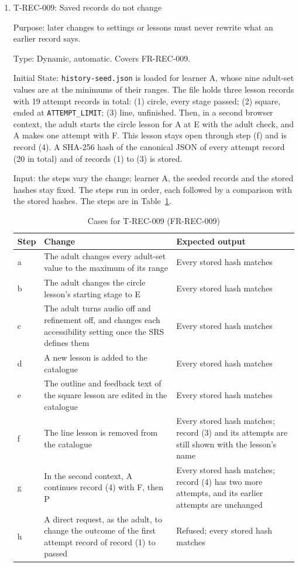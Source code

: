 \documentclass[12pt, titlepage]{article}
\newcommand{\testitem}[1]{\item #1\par\nopagebreak}
\begin{document}
\begin{enumerate}
How test will be performed: Playwright request routing. For (b), the
request reaches the server through \texttt{route.fetch()}, then the route
is aborted. A database read follows.

\testitem{T-REC-009: Saved records do not change}

Purpose: later changes to settings or lessons must never rewrite what an
earlier record says.

Type: Dynamic, automatic. Covers FR-REC-009.

Initial State: \texttt{history-\allowbreak{}seed.json} is loaded for
learner A, whose nine adult-set values are at the minimums of their
ranges. The file holds three lesson records with 19 attempt records in
total: (1) circle, every stage passed; (2) square, ended at
\texttt{ATTEMPT\_LIMIT}; (3) line, unfinished. Then, in a second browser
context, the adult starts the circle lesson for A at E with the adult
check, and A makes one attempt with F. This lesson stays open through step
(f) and is record (4). A SHA-256 hash of the canonical JSON of every
attempt record (20 in total) and of records (1) to (3) is stored.

Input: the steps vary the change; learner A, the seeded records and the
stored hashes stay fixed. The steps run in order, each followed by a
comparison with the stored hashes. The steps are in
Table~\ref{tab:t-rec-009}.

\begin{table}[htbp]
\centering\small
\caption{Cases for T-REC-009 (FR-REC-009)}
\label{tab:t-rec-009}
\begin{tabularx}{\textwidth}{@{}l >{\raggedright\arraybackslash}X
  >{\raggedright\arraybackslash}X@{}}
\toprule
\textbf{Step} & \textbf{Change} & \textbf{Expected output}\\
\midrule
a & The adult changes every adult-set value to the maximum of its range &
Every stored hash matches\\
b & The adult changes the circle lesson's starting stage to E & Every
stored hash matches\\
c & The adult turns audio off and refinement off, and changes each
accessibility setting once the SRS defines them & Every stored hash
matches\\
d & A new lesson is added to the catalogue & Every stored hash matches\\
e & The outline and feedback text of the square lesson are edited in the
catalogue & Every stored hash matches\\
f & The line lesson is removed from the catalogue & Every stored hash
matches; record (3) and its attempts are still shown with the lesson's
name\\
g & In the second context, A continues record (4) with F, then P & Every
stored hash matches; record (4) has two more attempts, and its earlier
attempts are unchanged\\
h & A direct request, as the adult, to change the outcome of the first
attempt record of record (1) to passed & Refused; every stored hash
matches\\
\bottomrule
\end{tabularx}
\end{table}


\end{enumerate}
\end{document}
